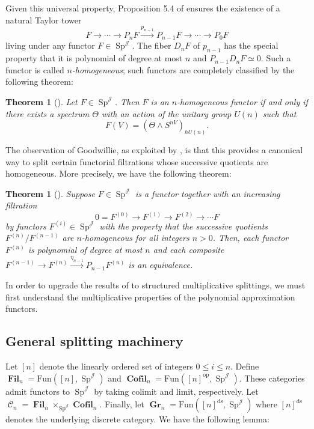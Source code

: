 \documentclass[reqno, oneside]{amsart}
\theoremstyle{definition}
\theoremstyle{plain}
\newtheorem{thm}[nul]{Theorem}
\DeclareMathOperator{\C}{\mathcal{C}}
\DeclareMathOperator{\Gr}{\textbf{Gr}}
\DeclareMathOperator{\Fil}{\textbf{Fil}}
\DeclareMathOperator{\Sp}{\text{Sp}}
\DeclareMathOperator{\J}{\mathcal{J}}
\DeclareMathOperator{\Cofil}{\textbf{Cofil}}
\begin{document}
Given this universal property, Proposition 5.4 of \cite{Weiss} ensures the existence of a natural Taylor tower $$F \longrightarrow \cdots \longrightarrow P_{n} F \xrightarrow{p_{n-1}} P_{n-1} F \longrightarrow \cdots \longrightarrow P_0F$$ living under any functor $F\in \Sp^{\J}.$  The fiber $D_n F$ of $p_{n-1}$ has the special property that it is polynomial of degree at most $n$ and $P_{n-1} D_n F \simeq 0$.  Such a functor is called \emph{$n$-homogeneous}; such functors are completely classified by the following theorem:

\begin{thm}[{{\cite[Theorem 7.3]{Weiss}}}]
Let $F\in \Sp^{\J}$.  Then $F$ is an $n$-homogeneous functor if and only if there exists a spectrum $\Theta$ with an action of the unitary group $U(n)$ such that $$F(V) = (\Theta \wedge S^{nV})_{hU(n)}.$$
\end{thm}

The observation of Goodwillie, as exploited by \cite{Arone}, is that this provides a canonical way to split certain functorial filtrations whose successive quotients are homogeneous.  More precisely, we have the following theorem:

\begin{thm}[\cite{Arone}]
Suppose $F \in \Sp^{\J}$ is a functor together with an increasing filtration $$0 = F^{(0)} \longrightarrow F^{(1)}\longrightarrow F^{(2)} \longrightarrow  \cdots F$$ by functors $F^{(i)}\in \Sp^{\J}$ with the property that the successive quotients $F^{(n)}/F^{(n-1)}$ are $n$-homogeneous for all integers $n>0$.  Then, each functor $F^{(n)}$ is polynomial of degree at most $n$ and each composite $F^{(n-1)} \longrightarrow F^{(n)} \xrightarrow{\eta_{n-1}} P_{n-1} F^{(n)}$ is an equivalence.
\end{thm}


In order to upgrade the results of \cite{Arone} to structured multiplicative splittings, we must first understand the multiplicative properties of the polynomial approximation functors.  


\subsection{General splitting machinery}


Let $[n]$ denote the linearly ordered set of integers $0\leq i\leq n$.  Define $\Fil_n = \text{Fun}([n], \Sp^{\J})$ and $\Cofil_n = \text{Fun}([n]^{\text{op}},\Sp^{\J})$.  These categories admit functors to $\Sp^{\J}$ by taking colimit and limit, respectively.  Let $\C_n = \Fil_n \times_{\Sp^{\J}} \Cofil_n.$  Finally, let $\Gr_n = \text{Fun}([n]^{\text{ds}}, \Sp^{\J})$ where $[n]^{\text{ds}}$ denotes the underlying discrete category.  We have the following lemma:
\end{document}
